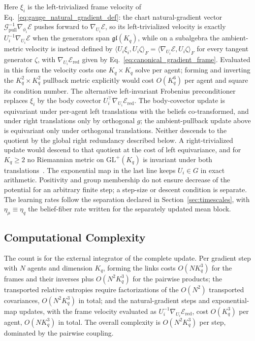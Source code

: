 Here $\xi_i$ is the left-trivialized frame velocity of Eq.~\eqref{eq:gauge_natural_gradient_def}: the chart natural-gradient vector $\mathcal{G}_{\mathrm{pull}}^{-1}\nabla_{\phi_i}\mathcal{E}$ pushes forward to $\nabla_{U_i}\mathcal{E}$, so its left-trivialized velocity is exactly $U_i^{-1}\nabla_{U_i}\mathcal{E}$ when the generators span $\mathfrak{gl}(K_q)$, while on a subalgebra the ambient-metric velocity is instead defined by $\langle U_i\xi_i,U_i\zeta\rangle_F=\langle\nabla_{U_i}\mathcal E,U_i\zeta\rangle_F$ for every tangent generator $\zeta$, with $\nabla_{U_i}\mathcal{E}_{\mathrm{red}}$ given by Eq.~\eqref{eq:canonical_gradient_frame}. Evaluated in this form the velocity costs one $K_q \times K_q$ solve per agent; forming and inverting the $K_q^2 \times K_q^2$ pullback metric explicitly would cost $O(K_q^6)$ per agent and square its condition number. The alternative left-invariant Frobenius preconditioner replaces $\xi_i$ by the body covector $U_i^\top\nabla_{U_i}\mathcal{E}_{\mathrm{red}}$. The body-covector update is equivariant under per-agent left translations with the beliefs co-transformed, and under right translations only by orthogonal $g$; the ambient-pullback update above is equivariant only under orthogonal translations. Neither descends to the quotient by the global right redundancy described below. A right-trivialized update would descend to that quotient at the cost of left equivariance, and for $K_q\ge2$ no Riemannian metric on $\mathrm{GL}^+(K_q)$ is invariant under both translations~\cite{Milnor1976}. The exponential map in the last line keeps $U_i\in G$ in exact arithmetic. Positivity and group membership do not ensure decrease of the potential for an arbitrary finite step; a step-size or descent condition is separate. The learning rates follow the separation declared in Section~\ref{sec:timescales}, with $\eta_\mu \equiv \eta_q$ the belief-fiber rate written for the separately updated mean block.

\subsection*{Computational Complexity}

The count is for the external integrator of the complete update. Per gradient step with $N$ agents and dimension $K_q$, forming the links costs $O(N K_q^3)$ for the frames and their inverses plus $O(N^2 K_q^3)$ for the pairwise products; the transported relative entropies require factorizations of the $O(N^2)$ transported covariances, $O(N^2 K_q^3)$ in total; and the natural-gradient steps and exponential-map updates, with the frame velocity evaluated as $U_i^{-1}\nabla_{U_i}\mathcal{E}_{\mathrm{red}}$, cost $O(K_q^3)$ per agent, $O(N K_q^3)$ in total. The overall complexity is $O(N^2 K_q^3)$ per step, dominated by the pairwise coupling.


